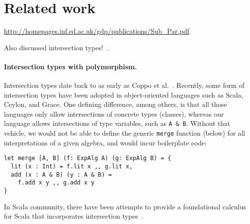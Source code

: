 \section{Related work} \label{sec:related-work}

\url{http://homepages.inf.ed.ac.uk/gdp/publications/Sub_Par.pdf}

\cite{plotkin1994subtyping}

Also discussed intersection types!~\cite{malayeri2008integrating}.



\paragraph{Intersection types with polymorphism.}

Intersection types date back to as early as Coppo et
al.~\cite{coppo1981functional}. Recently, some form of intersection types have
been adopted in object-oriented languages such as Scala, Ceylon, and Grace. One
defining difference, among others, is that all those languages only allow
intersections of concrete types (classes), whereas our language allows
intersections of type variables, such as \texttt{A \& B}. Without that vehicle,
we would not be able to define the generic \texttt{merge} function (below) for
all interpretations of a given algebra, and would incur boilerplate code:
\begin{verbatim}
let merge [A, B] (f: ExpAlg A) (g: ExpAlg B) = {
  lit (x : Int) = f.lit x ,, g.lit x,
  add (x : A & B) (y : A & B) =
    f.add x y ,, g.add x y
}
\end{verbatim}
In Scala community, there have been attempts to provide a foundational calculus
for Scala that incorporates intersection
types~\cite{amin2014foundations,amin2012dependent}.

